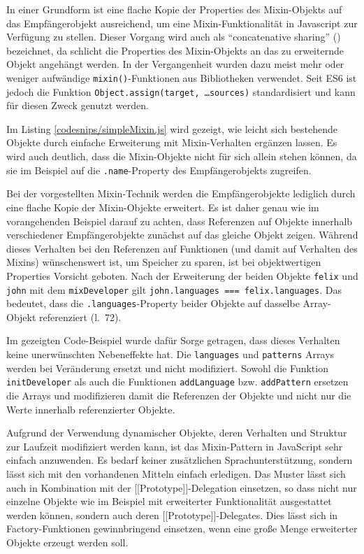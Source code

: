 In einer Grundform ist eine flache Kopie der Properties des Mixin-Objekts auf das Empfängerobjekt ausreichend, um eine Mixin-Funktionalität in Javascript zur Verfügung zu stellen. Dieser Vorgang wird auch als "`concatenative sharing"' (\citep{BraithwaiteWhyAreMixins2016}) bezeichnet, da schlicht die Properties des Mixin-Objekts an das zu erweiternde Objekt angehängt werden. In der Vergangenheit wurden dazu meist mehr oder weniger aufwändige \texttt{mixin()}-Funktionen aus Bibliotheken verwendet. Seit ES6 ist jedoch die Funktion \texttt{Object.assign(target, \ldots sources)} standardisiert und kann für diesen Zweck genutzt werden.

Im Listing \ref{codesnips/simpleMixin.js} wird gezeigt, wie leicht sich bestehende Objekte durch einfache Erweiterung mit Mixin-Verhalten ergänzen lassen. Es wird auch deutlich, dass die Mixin-Objekte nicht für sich allein stehen können, da sie im Beispiel auf die \texttt{.name}-Property des Empfängerobjekts zugreifen.


Bei der vorgestellten Mixin-Technik werden die Empfängerobjekte lediglich durch eine flache Kopie der Mixin-Objekte erweitert. Es ist daher genau wie im vorangehenden Beispiel darauf zu achten, dass Referenzen auf Objekte innerhalb verschiedener Empfängerobjekte zunächst auf das gleiche Objekt zeigen. Während dieses Verhalten bei den Referenzen auf Funktionen (und damit auf Verhalten des Mixins) wünschenswert ist, um Speicher zu sparen, ist bei objektwertigen Properties Vorsicht geboten. Nach der Erweiterung der beiden Objekte \texttt{felix} und \texttt{john} mit dem \texttt{mixDeveloper} gilt \texttt{john.languages === felix.languages}. 
Das bedeutet, dass die \texttt{.languages}-Property beider Objekte auf dasselbe Array-Objekt referenziert (l.~72). 

Im gezeigten Code-Beispiel wurde dafür Sorge getragen, dass dieses Verhalten keine unerwünschten Nebeneffekte hat. Die \texttt{languages} und \texttt{patterns} Arrays werden bei Veränderung ersetzt und nicht modifiziert. Sowohl die Funktion \texttt{initDeveloper} als auch die Funktionen \texttt{addLanguage} bzw. \texttt{addPattern} ersetzen die Arrays und modifizieren damit die Referenzen der Objekte und nicht nur die Werte innerhalb referenzierter Objekte. 

Aufgrund der Verwendung dynamischer Objekte, deren Verhalten und Struktur zur Laufzeit modifiziert werden kann, ist das Mixin-Pattern in JavaScript sehr einfach anzuwenden. Es bedarf keiner zusätzlichen Sprachunterstützung, sondern lässt sich mit den vorhandenen Mitteln einfach erledigen. Das Muster lässt sich auch in Kombination mit der [[Prototype]]-Delegation einsetzen, so dass nicht nur einzelne Objekte wie im Beispiel mit erweiterter Funktionalität ausgestattet werden können, sondern auch deren [[Prototype]]-Delegates. Dies lässt sich in Factory-Funktionen gewinnbringend einsetzen, wenn eine große Menge erweiterter Objekte erzeugt werden soll. 

